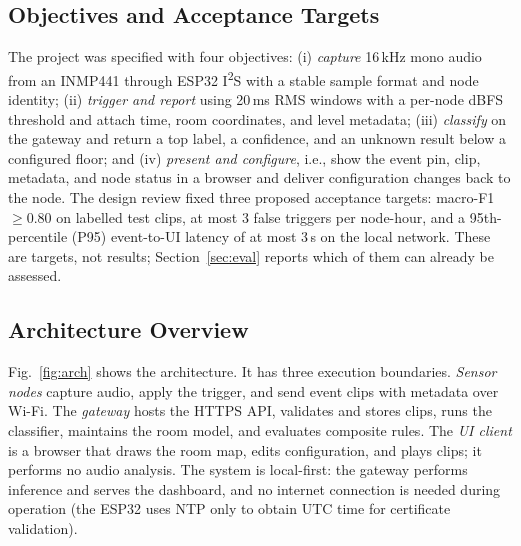 \documentclass[conference]{IEEEtran}
\newcommand{\ms}{\,ms}
\begin{document}
\subsection{Objectives and Acceptance Targets}
The project was specified with four objectives: (i) \emph{capture} 16\,kHz mono audio from an INMP441 through ESP32 I\textsuperscript{2}S with a stable sample format and node identity; (ii) \emph{trigger and report} using 20\ms{} RMS windows with a per-node dBFS threshold and attach time, room coordinates, and level metadata; (iii) \emph{classify} on the gateway and return a top label, a confidence, and an unknown result below a configured floor; and (iv) \emph{present and configure}, i.e., show the event pin, clip, metadata, and node status in a browser and deliver configuration changes back to the node. The design review fixed three proposed acceptance targets: macro-F1 $\geq 0.80$ on labelled test clips, at most 3 false triggers per node-hour, and a 95th-percentile (P95) event-to-UI latency of at most 3\,s on the local network. These are targets, not results; Section~\ref{sec:eval} reports which of them can already be assessed.

\subsection{Architecture Overview}
Fig.~\ref{fig:arch} shows the architecture. It has three execution boundaries. \emph{Sensor nodes} capture audio, apply the trigger, and send event clips with metadata over Wi-Fi. The \emph{gateway} hosts the HTTPS API, validates and stores clips, runs the classifier, maintains the room model, and evaluates composite rules. The \emph{UI client} is a browser that draws the room map, edits configuration, and plays clips; it performs no audio analysis. The system is local-first: the gateway performs inference and serves the dashboard, and no internet connection is needed during operation (the ESP32 uses NTP only to obtain UTC time for certificate validation).
\end{document}

